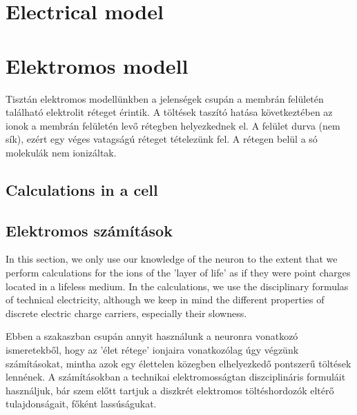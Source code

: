 
\ifx\magyar\undefined
\chapter[Electrical model]{Electrical model\label{ch:Modell-electrical}}
\else
\chapter[Elektromos modell]{Elektromos modell\label{ch:Modell-electrical}}
\fi
\iflatexml
\else
\minitoc
\fi

\ifx\magyar\undefined

%
\else
%
Tisztán elektromos modellünkben a jelenségek
csupán a membrán felületén található elektrolit réteget érintik. A töltések taszító hatása következtében az ionok
a membrán felületén levő rétegben helyezkednek el. 
A felület durva (nem sík), ezért egy véges vatagságú 
réteget tételezünk fel. 
A rétegen belül a só molekulák nem ionizáltak.
\fi

\ifx\magyar\undefined
\section[Calculations]{Calculations in a cell\label{sec:V2-0_ElectricCalculations}}
\else
\section[Elektromos számítások]{Elektromos számítások\label{sec:V2-0_ElectricCalculations}}
\fi

\ifx\magyar\undefined
In this section, we only use our knowledge of the neuron to the extent that we perform calculations for the ions of the 'layer of life' as if they were point charges located in a lifeless medium. In the calculations, we use the disciplinary formulas of technical electricity, although we keep in mind the different properties of discrete electric charge carriers, especially their slowness.

%
\else
%
Ebben a szakaszban csupán annyit használunk
a neuronra vonatkozó ismeretekből, hogy az 'élet rétege' ionjaira vonatkozólag úgy végzünk számításokat, mintha azok egy élettelen közegben elhelyezkedő pontszerű töltések lennének. A számításokban a technikai elektromosságtan diszciplináris
formuláit használjuk, bár szem előtt tartjuk a diszkrét elektromos töltéshordozók eltérő tulajdonságait, főként lassúságukat.

